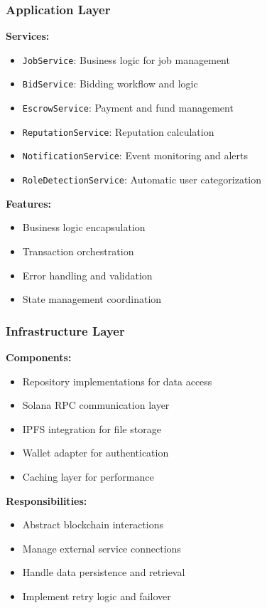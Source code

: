 \documentclass[a4paper,13pt,twoside]{report}
\theoremstyle{definition}
\begin{document}
\subsubsection{Application Layer}

\textbf{Services:}
\begin{itemize}
    \item \texttt{JobService}: Business logic for job management
    \item \texttt{BidService}: Bidding workflow and logic
    \item \texttt{EscrowService}: Payment and fund management
    \item \texttt{ReputationService}: Reputation calculation
    \item \texttt{NotificationService}: Event monitoring and alerts
    \item \texttt{RoleDetectionService}: Automatic user categorization
\end{itemize}

\textbf{Features:}
\begin{itemize}
    \item Business logic encapsulation
    \item Transaction orchestration
    \item Error handling and validation
    \item State management coordination
\end{itemize}

\subsubsection{Infrastructure Layer}

\textbf{Components:}
\begin{itemize}
    \item Repository implementations for data access
    \item Solana RPC communication layer
    \item IPFS integration for file storage
    \item Wallet adapter for authentication
    \item Caching layer for performance
\end{itemize}

\textbf{Responsibilities:}
\begin{itemize}
    \item Abstract blockchain interactions
    \item Manage external service connections
    \item Handle data persistence and retrieval
    \item Implement retry logic and failover
\end{itemize}
\end{document}
